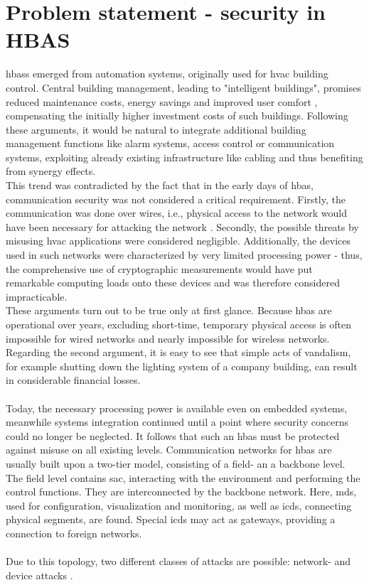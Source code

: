 \section{Problem statement - security in HBAS}\label{hbaSec}

\glspl{hbas} emerged from automation systems, originally used for \gls{hvac} building control.
Central building management, leading to "intelligent buildings", promises
reduced maintenance costs, energy savings and improved user comfort \cite{1435745}, compensating the initially higher investment costs of such buildings.
Following these arguments, it would be natural to integrate additional building management functions like alarm systems, access control or communication systems,
exploiting already existing infrastructure like cabling and thus benefiting from synergy effects.
\\
This trend was contradicted by the fact that in the early days of \gls{hbas}, communication security was not considered a critical requirement.
Firstly, the communication was done over wires,
i.e., physical access to the network would have been necessary for attacking the network \cite{knxSpec}. Secondly, the possible threats by misusing \gls{hvac} applications
were considered negligible. Additionally, the devices used in such networks were characterized by very limited processing power - thus, the comprehensive
use of cryptographic measurements would have put remarkable computing loads onto these devices and was therefore considered impracticable.
\\
These arguments turn out to be true only at first glance. Because \gls{hbas} are operational over years, excluding short-time, temporary physical access is often impossible
for wired networks and nearly impossible for
wireless networks. Regarding the second argument, it is easy to see that simple acts of vandalism, for example shutting down the lighting system of a company building, can result
in considerable financial losses.
\\
\\
Today, the necessary processing power is available even on embedded systems, meanwhile systems integration continued until a point where security concerns could
no longer be neglected. It follows that such an \gls{hbas} must be protected against misuse on all existing levels. 
Communication networks for \gls{hbas} are usually built upon a two-tier model, consisting of a field- an a backbone level. The field level contains \gls{sac},
interacting with the environment and performing the control functions. They are interconnected by the backbone network. Here, \glspl{md}, used for configuration,
visualization and monitoring, as well as \glspl{icd}, connecting physical segments, are found. Special \glspl{icd} may act as gateways, providing a connection to foreign networks. 
\\
\\
Due to this topology, two different classes of attacks are possible: network- and device attacks \cite{5332331}.

